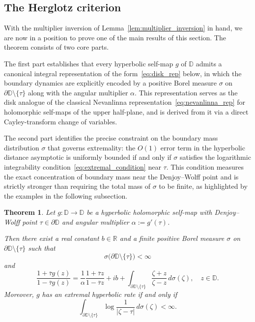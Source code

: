 \documentclass[12pt]{amsart}
\numberwithin{equation}{section}
\theoremstyle{plain}
\newtheorem{theorem}[equation]{Theorem}
\theoremstyle{definition}
\begin{document}
\subsection{The Herglotz criterion}
\label{subsec:herglotz_criterion}
With the multiplier inversion of Lemma~\ref{lem:multiplier_inversion} in hand, we are now in a position to prove one of the main results of this section. The theorem consists of two core parts.

The first part establishes that every hyperbolic self-map $g$ of $\mathbb{D}$ admits a canonical integral representation of the form~\eqref{eq:disk_rep} below, in which the boundary dynamics are explicitly encoded by a positive Borel measure $\sigma$ on $\partial\mathbb{D}\setminus\{\tau\}$ along with the angular multiplier $\alpha$. This representation serves as the disk analogue of the classical Nevanlinna representation~\eqref{eq:nevanlinna_rep} for holomorphic self-maps of the upper half-plane, and is derived from it via a direct Cayley-transform change of variables.

The second part identifies the precise constraint on the boundary mass distribution $\sigma$ that governs extremality: the $O(1)$ error term in the hyperbolic distance asymptotic is uniformly bounded if and only if $\sigma$ satisfies the logarithmic integrability condition~\eqref{eq:extremal_condition} near $\tau$. This condition measures the exact concentration of boundary mass near the Denjoy--Wolff point and is strictly stronger than requiring the total mass of $\sigma$ to be finite, as highlighted by the examples in the following subsection.

\begin{theorem}
\label{thm:herglotz_criterion}
Let $g:\mathbb{D}\to\mathbb{D}$ be a hyperbolic holomorphic self-map
with Denjoy--Wolff point $\tau\in\partial\mathbb{D}$ and angular
multiplier $\alpha:=g'(\tau)$.

Then there exist a real constant $b\in\mathbb{R}$ and a finite positive
Borel measure $\sigma$ on
$\partial\mathbb{D}\setminus\{\tau\}$ such that
\begin{equation*}
\label{eq:sigma_integrability}
\sigma\bigl(\partial\mathbb{D}\setminus\{\tau\}\bigr)<\infty
\end{equation*}
and
\begin{equation}
\label{eq:disk_rep}
\frac{1+\overline{\tau}g(z)}
     {1-\overline{\tau}g(z)}
=
\frac{1}{\alpha}
\frac{1+\overline{\tau}z}
     {1-\overline{\tau}z}
+ib
+\int_{\partial\mathbb{D}\setminus\{\tau\}}
\frac{\zeta+z}{\zeta-z}\,d\sigma(\zeta),
\quad z\in\mathbb{D}.
\end{equation}
Moreover, $g$ has an extremal hyperbolic rate if and only if
\begin{equation}
\label{eq:extremal_condition}
\int_{\partial\mathbb{D}\setminus\{\tau\}}
\log\frac{1}{|\zeta-\tau|}\,d\sigma(\zeta)
<\infty.
\end{equation}
\end{theorem}
\end{document}
